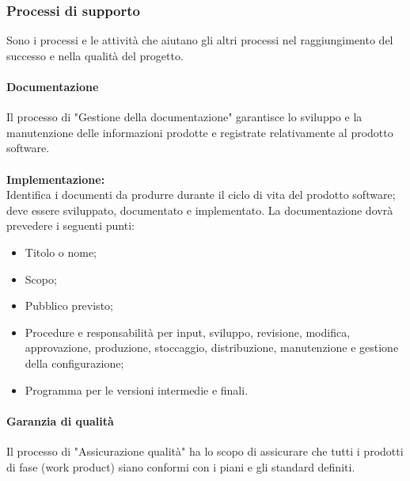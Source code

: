 \subsubsection{Processi di supporto}
Sono i processi e le attività che aiutano gli altri processi nel raggiungimento del successo e nella qualità del progetto.

\paragraph{Documentazione}
Il processo di "Gestione della documentazione" garantisce lo sviluppo e la manutenzione delle informazioni prodotte e registrate relativamente al prodotto software. \\ \\
\textbf{Implementazione:} \\ 
Identifica i documenti da produrre durante il ciclo di vita del prodotto software;
deve essere sviluppato, documentato e implementato. La documentazione dovrà prevedere i seguenti punti: 
\begin{itemize}
    \item Titolo o nome;
    \item Scopo;
    \item Pubblico previsto;
    \item Procedure e responsabilità per input, sviluppo, revisione, modifica, approvazione, produzione, stoccaggio, distribuzione, manutenzione e gestione della configurazione;
    \item Programma per le versioni intermedie e finali.
\end{itemize}

\paragraph{Garanzia di qualità}
Il processo di "Assicurazione qualità" ha lo scopo di assicurare che tutti i prodotti di fase (work product) siano conformi con i piani e gli standard definiti.

